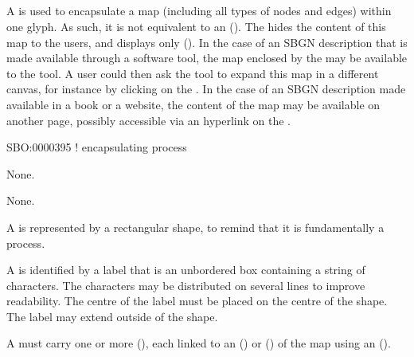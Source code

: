 \subsection{}\label{sec:submap}


A  is used to encapsulate a map (including all types of nodes and edges) within one glyph.
As such, it is not equivalent to an  ().
The  hides the content of this map to the users, and displays only  ().
In the case of an SBGN description that is made available through a software tool, the map enclosed by the   may be available to the tool.
A user could then ask the tool to expand this map in a different canvas, for instance by clicking on the .
In the case of an SBGN description made available in a book or a website, the content of the map may be available on another page, possibly accessible via an hyperlink on the .



\begin{glyphDescription}

\glyphSboTerm
SBO:0000395 ! encapsulating process


\glyphIncoming
None.



\glyphOutgoing
None.


\glyphContainer

A  is represented by a rectangular shape, to remind that it is fundamentally a process.


\glyphLabel

A  is identified by a label that is an unbordered box containing a string of characters.
The characters may be distributed on several lines to improve readability.
The centre of the label must be placed on the centre of the shape.
The label may extend outside of the shape.


\glyphAux

A  must carry one or more  (), each linked to an  () or  () of the map using an  ().

\end{glyphDescription}


